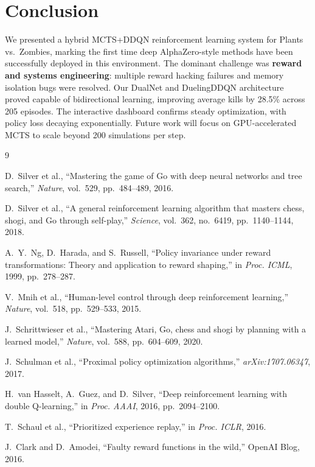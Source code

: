 \documentclass[conference]{IEEEtran}
\begin{document}
\section{Conclusion}

We presented a hybrid MCTS+DDQN reinforcement learning system for Plants vs.\ Zombies, marking the first time deep AlphaZero-style methods have been successfully deployed in this environment. The dominant challenge was \textbf{reward and systems engineering}: multiple reward hacking failures and memory isolation bugs were resolved. Our DualNet and DuelingDDQN architecture proved capable of bidirectional learning, improving average kills by 28.5\% across 205 episodes. The interactive dashboard confirms steady optimization, with policy loss decaying exponentially. Future work will focus on GPU-accelerated MCTS to scale beyond 200 simulations per step.

\begin{thebibliography}{9}

D.~Silver et al., ``Mastering the game of Go with deep neural networks and tree search,'' \emph{Nature}, vol.~529, pp.~484--489, 2016.

D.~Silver et al., ``A general reinforcement learning algorithm that masters chess, shogi, and Go through self-play,'' \emph{Science}, vol.~362, no.~6419, pp.~1140--1144, 2018.

A.~Y.~Ng, D.~Harada, and S.~Russell, ``Policy invariance under reward transformations: Theory and application to reward shaping,'' in \emph{Proc. ICML}, 1999, pp.~278--287.

V.~Mnih et al., ``Human-level control through deep reinforcement learning,'' \emph{Nature}, vol.~518, pp.~529--533, 2015.

J.~Schrittwieser et al., ``Mastering Atari, Go, chess and shogi by planning with a learned model,'' \emph{Nature}, vol.~588, pp.~604--609, 2020.

J.~Schulman et al., ``Proximal policy optimization algorithms,'' \emph{arXiv:1707.06347}, 2017.

H.~van Hasselt, A.~Guez, and D.~Silver, ``Deep reinforcement learning with double Q-learning,'' in \emph{Proc. AAAI}, 2016, pp.~2094--2100.

T.~Schaul et al., ``Prioritized experience replay,'' in \emph{Proc. ICLR}, 2016.

J.~Clark and D.~Amodei, ``Faulty reward functions in the wild,'' OpenAI Blog, 2016.

\end{thebibliography}
\end{document}
